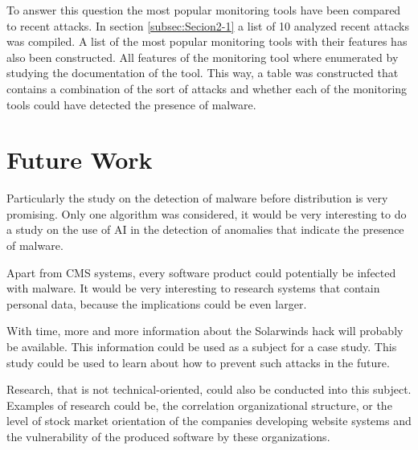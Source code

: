 \documentclass[a4paper, 10pt, conference]{ieeeconf}
\begin{document}
To answer this question the most popular monitoring tools have been compared to recent attacks. In section \ref{subsec:Secion2-1} a list of 10 analyzed recent attacks was compiled. A list of the most popular monitoring tools with their features has also been constructed. All features of the monitoring tool where enumerated by studying the documentation of the tool. This way, a table was constructed that contains a combination of the sort of attacks and whether each of the monitoring tools could have detected the presence of malware.


\section{Future Work}
Particularly the study on the detection of malware before distribution is very promising. Only one algorithm was considered, it would be very interesting to do a study on the use of AI in the detection of anomalies that indicate the presence of malware.

Apart from CMS systems, every software product could potentially be infected with malware. It would be very interesting to research systems that contain personal data, because the implications could be even larger.

With time, more and more information about the Solarwinds hack will probably be available. This information could be used as a subject for a case study. This study could be used to learn about how to prevent such attacks in the future.

Research, that is not technical-oriented, could also be conducted into this subject. Examples of research could be, the correlation organizational structure, or the level of stock market orientation of the companies developing website systems and the vulnerability of the produced software by these organizations. 





\end{document}

